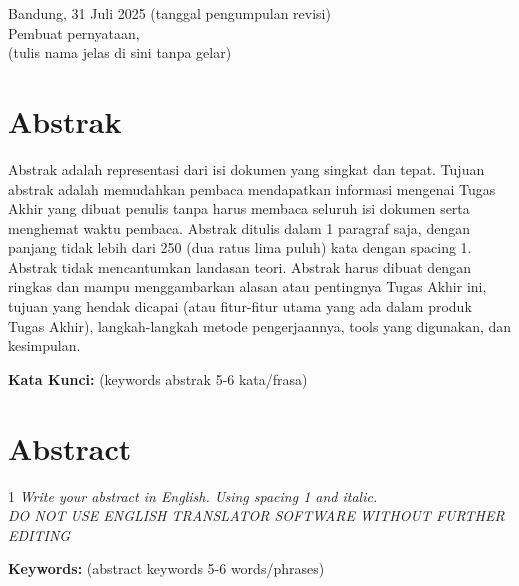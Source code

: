 \documentclass[a4paper,11pt,oneside]{report}
\begin{document}
\vspace{2cm}
\begin{flushright}
    Bandung, 31 Juli 2025 (tanggal pengumpulan revisi)\\[6pt]
    Pembuat pernyataan,\\[3cm]
    (tulis nama jelas di sini tanpa gelar)
\end{flushright}

\chapter*{Abstrak}

Abstrak adalah representasi dari isi dokumen yang singkat dan tepat. Tujuan
abstrak adalah memudahkan pembaca mendapatkan informasi mengenai Tugas Akhir
yang dibuat penulis tanpa harus membaca seluruh isi dokumen serta menghemat
waktu pembaca. Abstrak ditulis dalam 1 paragraf saja, dengan panjang tidak
lebih dari 250 (dua ratus lima puluh) kata dengan spacing 1. Abstrak tidak
mencantumkan landasan teori. Abstrak harus dibuat dengan ringkas dan mampu
menggambarkan alasan atau pentingnya Tugas Akhir ini, tujuan yang hendak
dicapai (atau fitur-fitur utama yang ada dalam produk Tugas Akhir),
langkah-langkah metode pengerjaannya, tools yang digunakan, dan kesimpulan.

\vspace{1cm}
\noindent\textbf{Kata Kunci:} (keywords abstrak 5-6 kata/frasa)

\chapter*{Abstract}

\begin{spacing}{1}
\textit{Write your abstract in English. Using spacing 1 and italic.\\
DO NOT USE ENGLISH TRANSLATOR SOFTWARE WITHOUT FURTHER EDITING}

\vspace{1cm}
\noindent\textbf{Keywords:} (abstract keywords 5-6 words/phrases)
\end{spacing}
\end{document}
